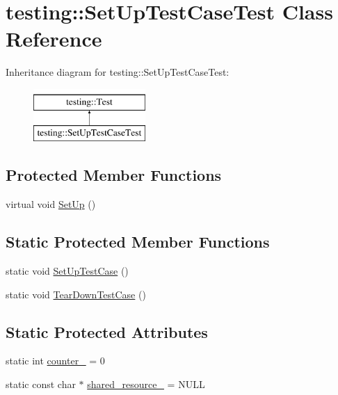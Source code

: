 \hypertarget{classtesting_1_1_set_up_test_case_test}{\section{testing\-:\-:Set\-Up\-Test\-Case\-Test Class Reference}
\label{classtesting_1_1_set_up_test_case_test}
}
Inheritance diagram for testing\-:\-:Set\-Up\-Test\-Case\-Test\-:\begin{figure}[H]
\begin{center}
\leavevmode
\includegraphics[height=2.000000cm]{classtesting_1_1_set_up_test_case_test}
\end{center}
\end{figure}
\subsection*{Protected Member Functions}
\begin{DoxyCompactItemize}
\item 
virtual void \hyperlink{classtesting_1_1_set_up_test_case_test_a4b44551ccf73e66de7ec95b2ab3b2085}{Set\-Up} ()
\end{DoxyCompactItemize}
\subsection*{Static Protected Member Functions}
\begin{DoxyCompactItemize}
\item 
static void \hyperlink{classtesting_1_1_set_up_test_case_test_a50732abc0bcb3725e6dfd6a2d487e944}{Set\-Up\-Test\-Case} ()
\item 
static void \hyperlink{classtesting_1_1_set_up_test_case_test_abdc133cd161ff2fa317f489da9bdccf3}{Tear\-Down\-Test\-Case} ()
\end{DoxyCompactItemize}
\subsection*{Static Protected Attributes}
\begin{DoxyCompactItemize}
\item 
static int \hyperlink{classtesting_1_1_set_up_test_case_test_a5b6e811128d35389be49f6569bf93817}{counter\-\_\-} = 0
\item 
static const char $\ast$ \hyperlink{classtesting_1_1_set_up_test_case_test_a904e77fd9a628b6a9aca0280665fd040}{shared\-\_\-resource\-\_\-} = N\-U\-L\-L
\end{DoxyCompactItemize}
